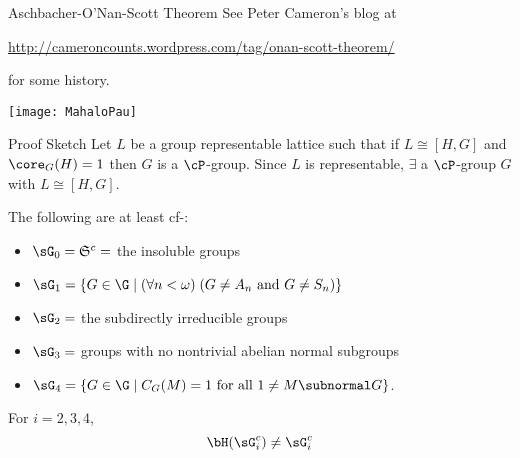 \begin{frame}[fragile,label=OSTheorem]{Aschbacher-O'Nan-Scott Theorem}
See Peter Cameron's blog at 
\begin{center}
{\small  \url{http://cameroncounts.wordpress.com/tag/onan-scott-theorem/}}
\end{center}
 for some history.
\end{frame}

\begin{frame}[fragile,label=FinalConclusions]{}
  \begin{center}
  \texttt{[image: MahaloPau]}
  \end{center}
\end{frame}

















\begin{frame}[label=IEPropsLemma2Alt]{}
\alert{Proof Sketch}
\vskip2mm
  Let $L$ be a group representable lattice such that if $L\cong [H,G]$ and
  $\core_G(H)=1$ then $G$ is a $\cP$-group.  
\vskip4mm
  Since $L$ is representable, $\exists$ a $\cP$-group $G$ with $L
  \cong [H,G]$. 
\vskip4mm
\end{frame}


\begin{frame}[label=IEPropsAlt2]{}
The following are at least cf-\IE: 
\vskip5mm
\begin{itemize}
\item $\sG_0 = \mathfrak{S}^c = $ the insoluble groups
\vskip2mm
\item $\sG_1 =\{G\in \G \mid (\forall n<\omega) \; (G \neq A_n \text{ and }  G\neq S_n) \}$
\vskip2mm
\item $\sG_2 = $ the subdirectly irreducible groups
\vskip2mm
\item $\sG_3 = $ groups with no nontrivial abelian normal subgroups
\vskip2mm
\item $\sG_4 = \{G\in \G \mid C_G(M) = 1 \text{ for all } 1\neq M\subnormal G\}$.
\end{itemize}
\vskip5mm
For $i= 2, 3, 4$,
\[\bH(\sG_i^c) \neq \sG_i^c\]
\end{frame}

